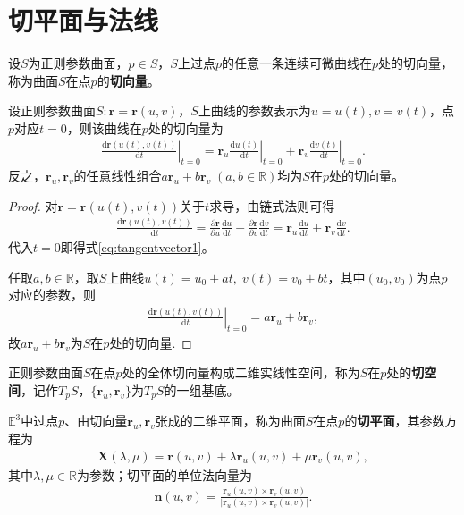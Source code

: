 \documentclass[../../main.tex]{subfiles}%
\begin{document}
\section{切平面与法线}

\begin{definition}
设$S$为正则参数曲面，$p\in S$，$S$上过点$p$的任意一条连续可微曲线在$p$处的切向量，称为曲面$S$在点$p$的\textbf{切向量}。
\end{definition}

\begin{proposition}
设正则参数曲面$S:\bm r=\bm r(u,v)$，$S$上曲线的参数表示为$u=u(t),v=v(t)$，点$p$对应$t=0$，则该曲线在$p$处的切向量为
\begin{align}
\left.\frac{\mathrm{d}\bm r(u(t),v(t))}{\mathrm{d}t}\right|_{t=0}=\left.\bm r_u\frac{\mathrm{d}u(t)}{\mathrm{d}t}\right|_{t=0}+\left.\bm r_v\frac{\mathrm{d}v(t)}{\mathrm{d}t}\right|_{t=0}.
\label{eq:tangentvector1}
\end{align}
反之，$\bm r_u,\bm r_v$的任意线性组合$a\bm r_u+b\bm r_v\;(a,b\in\mathbb{R})$均为$S$在$p$处的切向量。
\end{proposition}

\begin{proof}

对$\bm r=\bm r(u(t),v(t))$关于$t$求导，由链式法则可得
\begin{align*}
\frac{\mathrm{d}\bm r(u(t),v(t))}{\mathrm{d}t}=\frac{\partial\bm r}{\partial u}\frac{\mathrm{d}u}{\mathrm{d}t}+\frac{\partial\bm r}{\partial v}\frac{\mathrm{d}v}{\mathrm{d}t}=\bm r_u\frac{\mathrm{d}u}{\mathrm{d}t}+\bm r_v\frac{\mathrm{d}v}{\mathrm{d}t}.
\end{align*}
代入$t=0$即得式\eqref{eq:tangentvector1}。

任取$a,b\in\mathbb{R}$，取$S$上曲线$u(t)=u_0+at,\;v(t)=v_0+bt$，其中$(u_0,v_0)$为点$p$对应的参数，则
\begin{align*}
\left.\frac{\mathrm{d}\bm r(u(t),v(t))}{\mathrm{d}t}\right|_{t=0}=a\bm r_u+b\bm r_v,
\end{align*}
故$a\bm r_u+b\bm r_v$为$S$在$p$处的切向量.

\end{proof}

\begin{definition}
正则参数曲面$S$在点$p$处的全体切向量构成二维实线性空间，称为$S$在$p$处的\textbf{切空间}，记作$T_pS$，$\{\bm r_u,\bm r_v\}$为$T_pS$的一组基底。
\end{definition}

\begin{definition}
$\mathbb{E}^3$中过点$p$、由切向量$\bm r_u,\bm r_v$张成的二维平面，称为曲面$S$在点$p$的\textbf{切平面}，其参数方程为
\begin{align}
\bm X(\lambda,\mu)=\bm r(u,v)+\lambda\bm r_u(u,v)+\mu\bm r_v(u,v),
\label{eq:tangentplane}
\end{align}
其中$\lambda,\mu\in\mathbb{R}$为参数；切平面的单位法向量为
\begin{align}
\bm n(u,v)=\frac{\bm r_u(u,v)\times\bm r_v(u,v)}{|\bm r_u(u,v)\times\bm r_v(u,v)|}.
\label{eq:unitnormal}
\end{align}
\end{definition}
\end{document}
